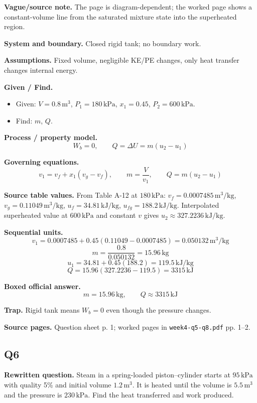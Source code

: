 \textbf{Vague/source note.} The page is diagram-dependent; the worked page shows a constant-volume line from the saturated mixture state into the superheated region.

\textbf{System and boundary.} Closed rigid tank; no boundary work.

\textbf{Assumptions.} Fixed volume, negligible KE/PE changes, only heat transfer changes internal energy.

\textbf{Given / Find.}
\begin{itemize}
  \item Given: $V=0.8\,\text{m}^3$, $P_1=180\,\text{kPa}$, $x_1=0.45$, $P_2=600\,\text{kPa}$.
  \item Find: $m$, $Q$.
\end{itemize}

\textbf{Process / property model.}
\[
W_b=0,\qquad Q=\Delta U=m(u_2-u_1)
\]

\textbf{Governing equations.}
\[
v_1=v_f+x_1(v_g-v_f),\qquad m=\frac{V}{v_1},\qquad Q=m(u_2-u_1)
\]

\textbf{Source table values.} From Table A-12 at $180\,\text{kPa}$: $v_f=0.0007485\,\text{m}^3/\text{kg}$, $v_g=0.11049\,\text{m}^3/\text{kg}$, $u_f=34.81\,\text{kJ/kg}$, $u_{fg}=188.2\,\text{kJ/kg}$. Interpolated superheated value at $600\,\text{kPa}$ and constant $v$ gives $u_2\approx 327.2236\,\text{kJ/kg}$.

\textbf{Sequential units.}
\[
v_1=0.0007485+0.45(0.11049-0.0007485)=0.050132\,\text{m}^3/\text{kg}
\]
\[
m=\frac{0.8}{0.050132}=15.96\,\text{kg}
\]
\[
u_1=34.81+0.45(188.2)=119.5\,\text{kJ/kg}
\]
\[
Q=15.96(327.2236-119.5)=3315\,\text{kJ}
\]

\textbf{Boxed official answer.}
\[
\boxed{m=15.96\,\text{kg},\qquad Q\approx 3315\,\text{kJ}}
\]

\textbf{Trap.} Rigid tank means $W_b=0$ even though the pressure changes.

\textbf{Source pages.} Question sheet p. 1; worked pages in \texttt{week4-q5-q8.pdf} pp. 1--2.


\subsection*{Q6}
\textbf{Rewritten question.} Steam in a spring-loaded piston--cylinder starts at $95\,\text{kPa}$ with quality 5\% and initial volume $1.2\,\text{m}^3$. It is heated until the volume is $5.5\,\text{m}^3$ and the pressure is $230\,\text{kPa}$. Find the heat transferred and work produced.

